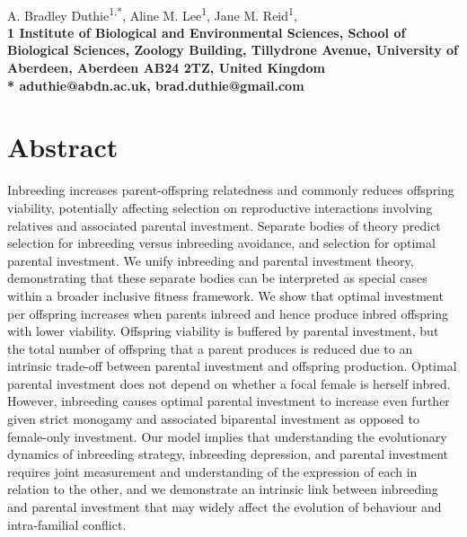 \documentclass[10pt,letterpaper]{article}
\begin{document}
\vspace*{0.35in}

\begin{flushleft}
{\LARGE
\textbf{}
}
\newline
\\
A. Bradley Duthie\textsuperscript{1,*},
Aline M. Lee\textsuperscript{1},
Jane M. Reid\textsuperscript{1},
\\
\bigskip
\bf{1} Institute of Biological and Environmental Sciences, School of Biological Sciences, Zoology Building, Tillydrone Avenue, University of Aberdeen, Aberdeen AB24 2TZ, United Kingdom
\\
\bigskip
*  aduthie@abdn.ac.uk, brad.duthie@gmail.com

\end{flushleft}

\section*{Abstract}
Inbreeding increases parent-offspring relatedness and commonly reduces offspring viability, potentially affecting selection on reproductive interactions involving relatives and associated parental investment. Separate bodies of theory predict selection for inbreeding versus inbreeding avoidance, and selection for optimal parental investment. We unify inbreeding and parental investment theory, demonstrating that these separate bodies can be interpreted as special cases within a broader inclusive fitness framework. We show that optimal investment per offspring increases when parents inbreed and hence produce inbred offspring with lower viability. Offspring viability is buffered by parental investment, but the total number of offspring that a parent produces is reduced due to an intrinsic trade-off between parental investment and offspring production. Optimal parental investment does not depend on whether a focal female is herself inbred. However, inbreeding causes optimal parental investment to increase even further given strict monogamy and associated biparental investment as opposed to female-only investment. Our model implies that understanding the evolutionary dynamics of inbreeding strategy, inbreeding depression, and parental investment requires joint measurement and understanding of the expression of each in relation to the other, and we demonstrate an intrinsic link between inbreeding and parental investment that may widely affect the evolution of behaviour and intra-familial conflict.
\end{document}
